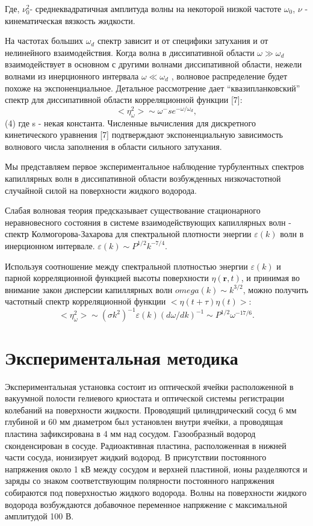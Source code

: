 Где, $\nu_0^2$- среднеквадратичная амплитуда волны на некоторой низкой частоте $\omega_0$, $\nu$ - кинематическая вязкость жидкости.

На частотах больших $\omega_d$ спектр зависит и от специфики затухания и от нелинейного взаимодействия. Когда волна в диссипативной области $\omega \gg \omega_d$ взаимодействует в основном с другими волнами диссипативной области, нежели волнами из инерционного интервала $\omega \ll \omega_d$ , волновое распределение будет похоже на экспоненциальное. Детальное рассмотрение дает “квазипланковский” спектр для диссипативной области корреляционной функции [7]:
\begin{equation}
<\eta_\omega^2> \sim \omega^-s e^{-\omega/\omega_d},
\end{equation}				(4)
где s - некая константа. Численные вычисления для дискретного кинетического уравнения [7] подтверждают экспоненциальную зависимость волнового числа заполнения в области сильного затухания.
	
	Мы представляем первое экспериментальное наблюдение турбулентных спектров капиллярных волн в диссипативной области возбужденных низкочастотной случайной силой на поверхности жидкого водорода.


Слабая волновая теория предсказывает существование стационарного неравновесного состояния в системе взаимодействующих капиллярных волн - спектр Колмогорова-Захарова для спектральной плотности энергии $\varepsilon(k)$ волн в инерционном интервале. $\varepsilon(k) \sim P^{1/2}k^{-7/4}$.

Используя соотношение между спектральной плотностью энергии $\varepsilon(k)$ и парной корреляционной функцией высоты поверхности $\eta(\mathbf{r}, t)$, и принимая во внимание закон дисперсии капиллярных волн $omega(k) \sim k^{3/2}$, можно получить частотный спектр корреляционной функции $<\eta(t+\tau)\eta(t)>$:
\begin{equation}
<\eta_\omega^2> \sim (\sigma k^2)^{-1} \varepsilon(k)(d\omega/dk)^{-1} \sim P^{1/2} \omega^{-17/6}.
\end{equation}

 


\section{Экспериментальная методика} %
 Экспериментальная установка состоит из оптической ячейки расположенной в вакуумной полости гелиевого криостата и оптической системы регистрации колебаний на поверхности жидкости. Проводящий цилиндрический сосуд 6 мм глубиной и 60 мм диаметром был установлен внутри ячейки, а проводящая пластина зафиксирована в 4 мм над сосудом. Газообразный водород сконденсирован в сосуде. Радиоактивная пластина, расположенная в нижней части сосуда, ионизирует жидкий водород. В присутствии постоянного напряжения около 1 кВ между сосудом и верхней пластиной, ионы разделяются и заряды со знаком соответствующим полярности постоянного напряжения собираются под поверхностью жидкого водорода. Волны на поверхности жидкого водорода возбуждаются добавочное переменное напряжение с максимальной амплитудой 100 В.

